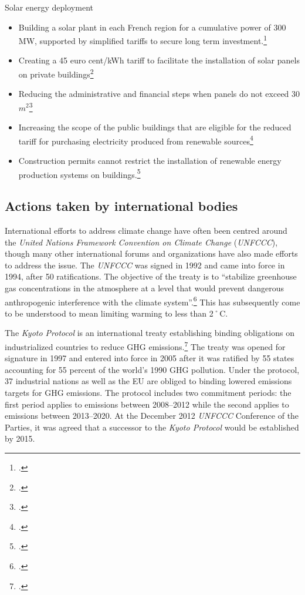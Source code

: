 \documentclass[10pt]{article}
\begin{document}
Solar energy deployment
\begin{itemize}
	\item Building a solar plant in each French region for a cumulative power of 300 MW, supported by simplified tariffs to secure long term investment.\footcite[][]{GrenellePolicies}
	\item Creating a 45 euro cent/kWh tariff to facilitate the installation of solar panels on private buildings\footcite[][]{GrenellePolicies}
	\item Reducing the administrative and financial steps when panels do not exceed 30 $m^2$\footcite[][]{GrenellePolicies}
	\item Increasing the scope of the public buildings that are eligible for the reduced tariff for purchasing electricity produced from renewable sources\footcite[][]{GrenellePolicies}
	\item Construction permits cannot restrict the installation of renewable energy production systems on buildings.\footcite[][]{GrenellePolicies}
\end{itemize}






		\subsection{Actions taken by international bodies}
		
		
		



International efforts to address climate change have often been centred around the \emph{United Nations Framework Convention on Climate Change} (\emph{UNFCCC}), though many other international forums and organizations have also made efforts to address the issue. 
The \emph{UNFCCC} was signed in 1992 and came into force in 1994, after 50 ratifications.
The objective of the treaty is to ``stabilize greenhouse gas concentrations in the atmosphere at a level that would prevent dangerous anthropogenic interference with the climate system''.\footcite[][Artice 2: "Objective"]{UNFCCC}
This has subsequently come to be understood to mean limiting warming to less than 2˚C.



The \emph{Kyoto Protocol} is an international treaty establishing binding obligations on industrialized countries to reduce GHG emissions.\footcite[][]{KyotoProtocol}
The treaty was opened for signature in 1997 and entered into force in 2005 after it was ratified by 55 states accounting for 55 percent of the world's 1990 GHG pollution.
Under the protocol, 37 industrial nations as well as the EU are obliged to binding lowered emissions targets for GHG emissions.
The protocol includes two commitment periods: the first period applies to emissions between 2008--2012 while the second  applies to emissions between 2013--2020. 
At the December 2012 \emph{UNFCCC} Conference of the Parties, it was agreed that a successor to the \emph{Kyoto Protocol} would be established by 2015.
\end{document}

